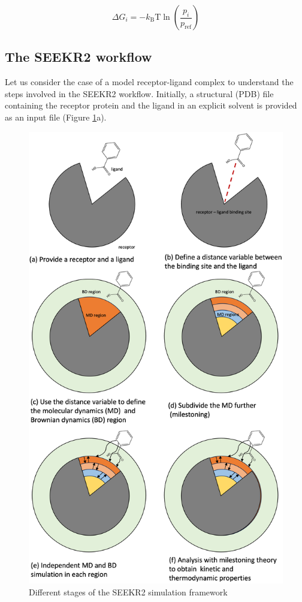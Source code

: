 \documentclass[9pt,training,pubversion]{livecoms}
\begin{document}
\begin{equation}
\Delta G_{i} = - k_{\mathrm{B}} \text{T} \ln\left(\frac{p_{i}}{p_{\mathrm{ref}}}\right)
\label{eqm}
\end{equation}

\subsection{The SEEKR2 workflow} \label{seekr_framework}

\vspace{2mm}

Let us consider the case of a model receptor-ligand complex to understand the steps involved in the SEEKR2 workflow. Initially, a structural (PDB) file containing the receptor protein and the ligand in an explicit solvent is provided as an input file (Figure \ref{figure2}a).

\begin{figure}[H]
\centering
\includegraphics[scale=0.45]{images/figure2.png} 
\caption{Different stages of the SEEKR2 simulation framework}
\label{figure2}
\end{figure} 
\end{document}
